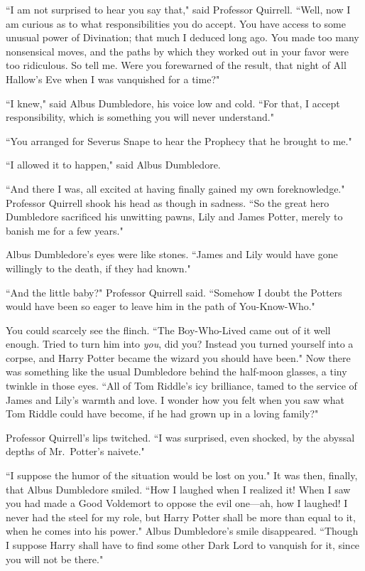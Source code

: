 ``I am not surprised to hear you say that," said Professor Quirrell. ``Well, now I am curious as to what responsibilities you do accept. You have access to some unusual power of Divination; that much I deduced long ago. You made too many nonsensical moves, and the paths by which they worked out in your favor were too ridiculous. So tell me. Were you forewarned of the result, that night of All Hallow's Eve when I was vanquished for a time?"

``I knew," said Albus Dumbledore, his voice low and cold. ``For that, I accept responsibility, which is something you will never understand."

``You arranged for Severus Snape to hear the Prophecy that he brought to me."

``I allowed it to happen," said Albus Dumbledore.

``And there I was, all excited at having finally gained my own foreknowledge." Professor Quirrell shook his head as though in sadness. ``So the great hero Dumbledore sacrificed his unwitting pawns, Lily and James Potter, merely to banish me for a few years."

Albus Dumbledore's eyes were like stones. ``James and Lily would have gone willingly to the death, if they had known."

``And the little baby?" Professor Quirrell said. ``Somehow I doubt the Potters would have been so eager to leave him in the path of You-Know-Who."

You could scarcely see the flinch. ``The Boy-Who-Lived came out of it well enough. Tried to turn him into \emph{you}, did you? Instead you turned yourself into a corpse, and Harry Potter became the wizard you should have been." Now there was something like the usual Dumbledore behind the half-moon glasses, a tiny twinkle in those eyes. ``All of Tom Riddle's icy brilliance, tamed to the service of James and Lily's warmth and love. I wonder how you felt when you saw what Tom Riddle could have become, if he had grown up in a loving family?"

Professor Quirrell's lips twitched. ``I was surprised, even shocked, by the abyssal depths of Mr.~Potter's naivete."

``I suppose the humor of the situation would be lost on you." It was then, finally, that Albus Dumbledore smiled. ``How I laughed when I realized it! When I saw you had made a Good Voldemort to oppose the evil one---ah, how I laughed! I never had the steel for my role, but Harry Potter shall be more than equal to it, when he comes into his power." Albus Dumbledore's smile disappeared. ``Though I suppose Harry shall have to find some other Dark Lord to vanquish for it, since you will not be there."

